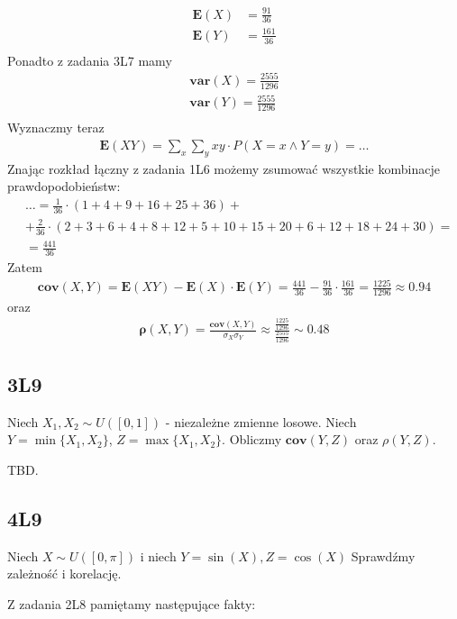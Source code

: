 \documentclass{article}
\numberwithin{equation}{subsection}
\begin{document}
\begin{align}
    \mathbf{E}(X) &= \frac{91}{36}\\
    \mathbf{E}(Y) &= \frac{161}{36}\\
\end{align}
Ponadto z zadania 3L7 mamy
\begin{align}
    \mathbf{var}(X) = \frac{2555}{1296}\\
    \mathbf{var}(Y) = \frac{2555}{1296}\\
\end{align}
Wyznaczmy teraz
\begin{align}
    \mathbf{E}(XY) = \sum_{x} \sum_{y} xy \cdot P(X=x \land Y=y) = \dots
\end{align}
Znając rozkład łączny z zadania 1L6 możemy zsumować wszystkie kombinacje prawdopodobieństw:
\begin{align}
    &\dots = \frac{1}{36} \cdot (1+4+9+16+25+36) + \\
    &+ \frac{2}{36} \cdot (2+3+6+4+8+12+5+10+15+20+6+12+18+24+30) = \\
    &= \frac{441}{36}
\end{align}
Zatem
\begin{align}
    \mathbf{cov}(X,Y) = \mathbf{E}(XY) - \mathbf{E}(X)\cdot\mathbf{E}(Y)
    =\frac{441}{36} - \frac{91}{36} \cdot \frac{161}{36} = \frac{1225}{1296} \approx 0.94
\end{align}
oraz
\begin{align}
    \mathbf{\rho}(X,Y) = \frac{\mathbf{cov}(X,Y)}{\sigma_X \sigma_Y} \approx \frac{\frac{1225}{1296}}{\frac{2555}{1296}} \sim 0.48
\end{align}

\subsection{3L9}

Niech $X_1,X_2 \sim U([0,1])$ - niezależne zmienne losowe. Niech $Y=\min\{X_1,X_2\}$, $Z=\max\{X_1,X_2\}$. Obliczmy $\mathbf{cov}(Y,Z)$ oraz $\rho(Y,Z)$.

\noindent
TBD.

\subsection{4L9}

Niech $X \sim U(\left[0,\pi\right])$ i niech $Y=\sin(X), Z=\cos(X)$ Sprawdźmy zależność i korelację.

\noindent
Z zadania 2L8 pamiętamy następujące fakty:
\end{document}
